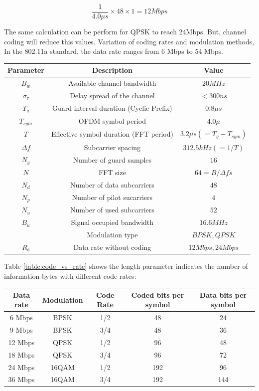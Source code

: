 \begin{equation} \label{bitrate_achiv}
\frac{1}{4.0\mu s} \times 48 \times 1= 12Mbps
\end{equation}

The same calculation can be perform for QPSK to reach 24Mbps. But, channel coding will reduce this values. Variation of coding rates and modulation methods, In the 802.11a standard, the data rate ranges from 6 Mbps to 54 Mbps.\\

\begin{center}
\label{table:sys_param}
\vspace{0.5cm}
\begin{tabular}{c|c|c}
Parameter&Description&Value\\ \hline
$B_{w}$&Available channel bandwidth&$20MHz$\\
$\sigma_{\tau}$&Delay spread of the channel& $<300 ns$\\
$T_{g}$&Guard interval duration (Cyclic Prefix)&$0.8\mu s$\\
$T_{sym}$&OFDM symbol period&$4.0\mu$\\
$T$&Effective symbol duration (FFT period)&$3.2\mu s (=T_{g}- T_{sym})$\\
$\Delta f$&Subcarrier spacing&$312.5kHz (=1/T)$\\
$N_{g}$&Number of guard samples&$16$\\
$N$&FFT size&$64= B/\Delta f s$\\
$N_{d}$&Number of data subcarriers&$48$\\
$N_{p}$&Number of pilot sucarriers&$4$\\
$N_{u}$&Number of used subcarriers&$52$\\
$B_{u}$&Signal occupied bandwidth&$16.6MHz$\\
&Modulation type&$BPSK, QPSK$\\
$R_{b}$&Data rate without coding&$12Mbps, 24Mbps$\\
\end{tabular}
\end{center}

Table \ref{table:code_vs_rate} shows the length parameter indicates the number of information bytes with different code rates:

\begin{center}
\label{table:code_vs_rate}
\vspace{0.5cm}
\begin{tabular}{c|c|c|c|c}
Data rate&Modulation&Code Rate&Coded bits per symbol&Data bits per symbol\\ \hline
6 Mbps&BPSK&1/2&48&24\\
9 Mbps&BPSK&3/4&48&36\\
12 Mbps&QPSK&1/2&96&48\\
18 Mbps&QPSK&3/4&96&72\\
24 Mbps&16QAM&1/2&192&96\\
36 Mbps&16QAM&3/4&192&144\\
\end{tabular}
\end{center}

